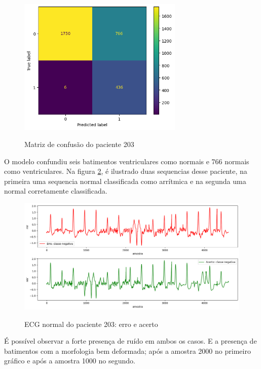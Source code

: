 \begin{figure}[H]
  \centering
  \caption{Matriz de confusão do paciente 203}
   \includegraphics[width=0.7\textwidth]{figuras/analise_erros/matriz_confusao_paciente_mais_dificil.png} 
  \label{fig:matriz_confusao_paciente_mais_dificil}
\end{figure}

O modelo confundiu seis batimentos ventriculares como normais e 766 normais como ventriculares. Na figura
\ref{fig:erro_acert_neg_class_paciente_mais_dificil}, é ilustrado duas sequencias desse paciente, na primeira
uma sequencia normal classificada como arrítmica e na segunda uma normal corretamente classificada.

\begin{figure}[H]
  \centering
  \caption{ECG normal do paciente 203: erro e acerto}
   \includegraphics[width=1.0\textwidth]{figuras/analise_erros/ecg_erro_acerto_neg_paciente_mais_dificil.png} 
  \label{fig:erro_acert_neg_class_paciente_mais_dificil}
\end{figure}

É possível observar a forte presença de ruído em ambos os casos. E a presença de batimentos com a morfologia 
bem deformada; após a amostra 2000 no primeiro gráfico e após a amostra 1000 no segundo.


